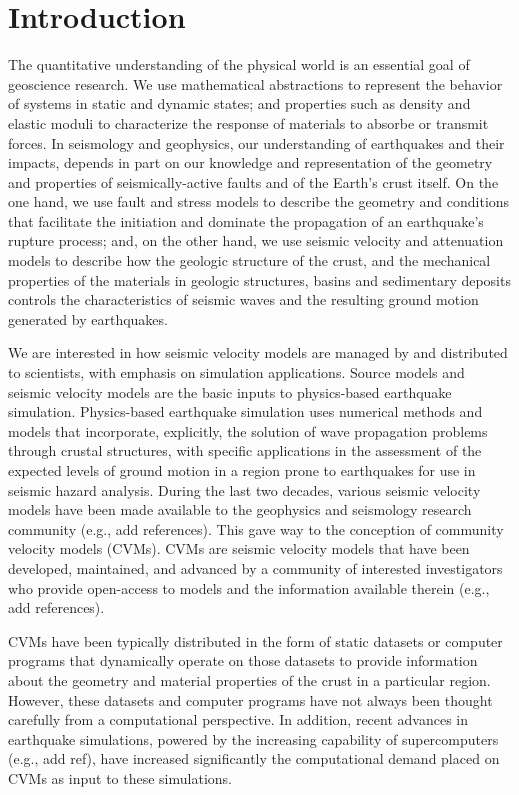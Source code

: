 
\section{Introduction}
\label{sec:introduction}

The quantitative understanding of the physical world is an essential goal of geoscience research. We use mathematical abstractions to represent the behavior of systems in static and dynamic states; and properties such as density and elastic moduli to characterize the response of materials to absorbe or transmit forces. In seismology and geophysics, our understanding of earthquakes and their impacts, depends in part on our knowledge and representation of the geometry and properties of seismically-active faults and of the Earth's crust itself. On the one hand, we use fault and stress models to describe the geometry and conditions that facilitate the initiation and dominate the propagation of an earthquake's rupture process; and, on the other hand, we use seismic velocity and attenuation models to describe how the geologic structure of the crust, and the mechanical properties of the materials in geologic structures, basins and sedimentary deposits controls the characteristics of seismic waves and the resulting ground motion generated by earthquakes.

We are interested in how seismic velocity models are managed by and distributed to scientists, with emphasis on simulation applications. Source models and seismic velocity models are the basic inputs to physics-based earthquake simulation. Physics-based earthquake simulation uses numerical methods and models that incorporate, explicitly, the solution of wave propagation problems through crustal structures, with specific applications in the assessment of the expected levels of ground motion in a region prone to earthquakes for use in seismic hazard analysis. During the last two decades, various seismic velocity models have been made available to the geophysics and seismology research community (e.g., add references). This gave way to the conception of community velocity models (CVMs). CVMs are seismic velocity models that have been developed, maintained, and advanced by a community of interested investigators who provide open-access to models and the information available therein (e.g., add references). 

CVMs have been typically distributed in the form of static datasets or computer programs that dynamically operate on those datasets to provide information about the geometry and material properties of the crust in a particular region. However, these datasets and computer programs have not always been thought carefully from a computational perspective. In addition, recent advances in earthquake simulations, powered by the increasing capability of supercomputers (e.g., add ref), have increased significantly the computational demand placed on CVMs as input to these simulations. 


